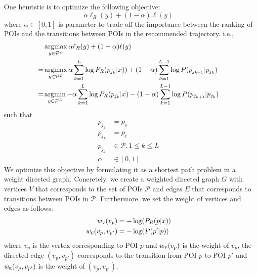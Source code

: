 One heuristic is to optimize the following objective:
\begin{displaymath}
    \alpha \ell_R(y) + (1-\alpha) \ell(y)
\end{displaymath}
where $\alpha \in [0, 1]$ is parameter to trade-off the importance between the ranking of POIs
and the transitions between POIs in the recommended trajectory.
i.e.,
\begin{align*}
    & \operatorname*{argmax}_{y \in \mathcal{P}^L} \alpha \ell_R(y) + (1-\alpha) \ell(y) \\
   =& \operatorname*{argmax}_{y \in \mathcal{P}^L} \alpha \sum_{k=1}^L \log P_R(p_{j_k} | x)) +
      (1-\alpha) \sum_{k=1}^{L-1} \log P(p_{j_{k+1}} | p_{j_k}) \\
   =& \operatorname*{argmin}_{y \in \mathcal{P}^L} - \alpha \sum_{k=1}^L \log P_R(p_{j_k} | x) -
      (1-\alpha) \sum_{k=1}^{L-1} \log P(p_{j_{k+1}} | p_{j_k})
\end{align*}
such that
\begin{align*}
    p_{j_1} &= p_s \\
    p_{j_L} &= p_e \\
    p_{j_k} &\in \mathcal{P}, 1 \le k \le L \\
    \alpha  &\in [0, 1]
\end{align*}
We optimize this objective by formulating it as a shortest path problem in a weight directed graph.
Concretely,
we create a weighted directed graph $G$ with vertices $V$ that corresponds to the set of POIs $\mathcal{P}$ and
edges $E$ that corresponds to transitions between POIs in $\mathcal{P}$.
Furthermore, we set the weight of vertices and edges as follows:
\begin{align*}
    w_{\textsc{v}}(v_{p})       & = -\log(P_R(p | x)) \\
    w_{\textsc{e}}(v_p, v_{p'}) & = -\log(P(p' | p))
\end{align*}
where $v_{p}$ is the vertex corresponding to POI $p$ and $w_{\textsc{v}}(v_{p})$ is the weight of $v_{p}$,
the directed edge $(v_p, v_{p'})$ corresponds to the transition from POI $p$ to POI $p'$ and
$w_{\textsc{e}}(v_p, v_{p'})$ is the weight of $(v_p, v_{p'})$.

